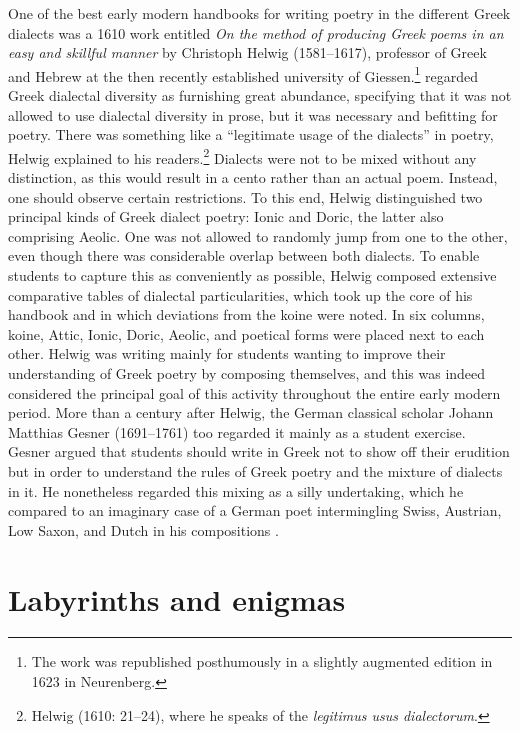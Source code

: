 One of the best early modern handbooks for writing poetry in the different Greek dialects was a 1610 work entitled \textit{On the method of producing Greek poems in an easy and skillful manner} by Christoph Helwig (1581–1617), professor of Greek and Hebrew at the then recently established university of Giessen.\footnote{The work was republished posthumously in a slightly augmented edition in 1623 in Neurenberg.} \citet[19]{Helwig1610} regarded Greek dialectal diversity as furnishing great abundance, specifying that it was not allowed to use dialectal diversity in prose, but it was necessary and befitting for poetry. There was something like a “legitimate usage of the dialects” in poetry, Helwig explained to his readers.\footnote{Helwig (1610: 21–24), where he speaks of the \textit{legitimus usus dialectorum}.} Dialects were not to be mixed without any distinction, as this would result in a cento rather than an actual poem. Instead, one should observe certain restrictions. To this end, Helwig distinguished two principal kinds of Greek dialect poetry: Ionic and Doric, the latter also comprising Aeolic. One was not allowed to randomly jump from one to the other, even though there was considerable overlap between both dialects. To enable students to capture this as conveniently as possible, Helwig composed extensive comparative tables of dialectal particularities, which took up the core of his handbook and in which deviations from the koine were noted. In six columns, koine, Attic, Ionic, Doric, Aeolic, and poetical forms were placed next to each other. Helwig was writing mainly for students wanting to improve their understanding of Greek poetry by composing themselves, and this was indeed considered the principal goal of this activity throughout the entire early modern period. More than a century after Helwig, the German classical scholar Johann Matthias Gesner (1691–1761) too regarded it mainly as a student exercise. Gesner argued that students should write in Greek not to show off their erudition but in order to understand the rules of Greek poetry and the mixture of dialects in it. He nonetheless regarded this mixing as a silly undertaking, which he compared to an imaginary case of a German poet intermingling Swiss, Austrian, Low Saxon, and Dutch in his compositions \citep[162]{Gesner1774}.

\section{Labyrinths and enigmas}\label{sec:3.3}

